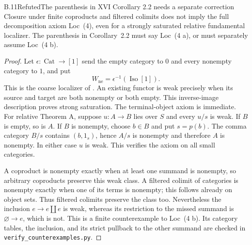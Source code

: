 \begin{claim}{B.11}{Refuted}{The parenthesis in XVI Corollary 2.2 needs a separate correction}
Closure under finite coproducts and filtered colimits does not imply
the full decomposition axiom Loc~(4), even for a strongly saturated
relative fundamental localizer. The parenthesis in Corollary~2.2 must
say Loc~(4 a), or must separately assume Loc~(4 b).
\end{claim}
\begin{proof}
Let $\epsilon:\operatorname{Cat}\to[1]$ send the empty category to $0$
and every nonempty category to $1$, and put
\[
 W_{\mathrm{ne}}=\epsilon^{-1}(\operatorname{Iso}[1]).
\]
This is the coarse localizer of
\citet[Example~1.1.30]{RESMalts2020}.
An existing functor is weak precisely when its source and target
are both nonempty or both empty. This inverse-image description proves
strong saturation. The terminal-object axiom is immediate. For relative
Theorem A, suppose $u:A\to B$ lies over $S$ and every $u/s$ is weak.
If $B$ is empty, so is $A$. If $B$ is nonempty, choose $b\in B$ and
put $s=p(b)$. The comma category $B/s$ contains $(b,1_s)$, hence $A/s$
is nonempty and therefore $A$ is nonempty. In either case $u$ is weak.
This verifies the axiom on all small categories.

A coproduct is nonempty exactly when at least one summand is nonempty,
so arbitrary coproducts preserve this weak class. A filtered colimit of
categories is nonempty exactly when one of its terms is nonempty; this
follows already on object sets. Thus filtered colimits preserve the
class too. Nevertheless the inclusion $e\to e\amalg e$ is weak,
whereas its restriction to the missed summand is $\varnothing\to e$,
which is not. This is a finite counterexample to Loc~(4 b). Its category
tables, the inclusion, and its strict pullback to the other summand are
checked in \texttt{verify\_counterexamples.py}.
\end{proof}

